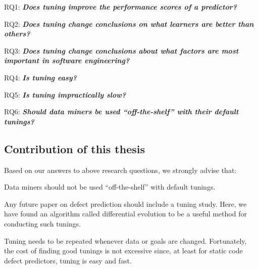\bi
\item RQ1: {\bf{\em Does   tuning    improve the performance scores of a predictor?}} %
\item RQ2: {\bf {\em Does tuning change conclusions on what learners are better than others?}} 
\item RQ3: {\bf {\em Does tuning change conclusions about what factors are most important in software engineering?}} %
\item  RQ4: {\bf {\em Is tuning easy?}} %
\item RQ5: {\bf {\em Is tuning impractically slow?}} %
\item RQ6: {\bf{\em Should data miners be used ``off-the-shelf'' with their default tunings?}}
\ei

\subsection{Contribution of this thesis}

Based on our answers to above research questions,  we strongly advise that:
\bi
\item
Data miners should not be used ``off-the-shelf'' with default tunings.
\item
Any future paper on defect prediction should include a 
tuning study. Here, we have found  an algorithm called differential
evolution to be a useful method for conducting such
tunings.
\item
Tuning needs to be repeated
whenever data or goals are changed.
Fortunately, the cost of finding good tunings is not excessive since, at least for
static code defect predictors, tuning is easy and fast.
\ei

